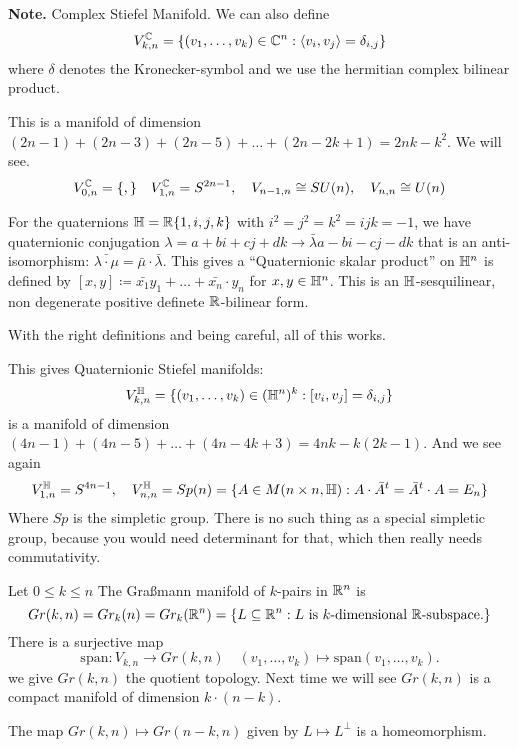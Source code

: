\documentclass[language=english]{TemplateLecture}
\begin{document}
\begin{example}
    \textbf{Note.} Complex Stiefel Manifold. We can also define
    \[V_{k,n}^{\mathbb{C}} = \{(v_1, \dots, v_k) \in \mathbb{C}^n : \langle v_i, v_j\rangle = \delta_{i,j}\}\]
    where \(\delta\) denotes the Kronecker-symbol and we use the hermitian complex bilinear product. 

    This is a manifold of dimension \((2n-1) + (2n-3) + (2n-5) + \dots + (2n-2k +1) = 2nk - k^2\). We will see.
    \[V_{0,n}^\IC = \set *, \quad V_{1,n}^\IC = S^{2n-1}, \quad V_{n-1,n} \cong SU(n), \quad V_{n,n} \cong U(n)\]

    For the quaternions \(\mathbb{H} = \mathbb{R}\{1, i,j,k\}\) with \(i^2 = j^2 = k^2 = ijk = -1\), we have quaternionic conjugation \(\lambda = a + bi + cj + dk \to \bar \lambda a- bi - cj - dk\) that is an anti-isomorphism: \(\bar{\lambda \cdot \mu} = \bar \mu \cdot \bar \lambda\). This gives a \enquote{Quaternionic skalar product} on \(\mathbb{H}^n\) is defined by \([x,y] \coloneq \bar{x_1} y_1 + \dots + \bar{x_n} \cdot y_n\) for \(x,y \in \mathbb{H}^n\). This is an \(\mathbb{H}\)-sesquilinear, non degenerate positive definete \(\mathbb{R}\)-bilinear form.

    With the right definitions and being careful, all of this works.

    This gives Quaternionic Stiefel manifolds:
    \[V_{k,n}^{\mathbb{H}} = \{(v_1, \dots, v_k) \in (\mathbb{H}^n)^k : [v_i, v_j] = \delta_{i,j}\}\]
    is a manifold of dimension \((4n-1) + (4n-5) + \dots + (4n - 4k +3) = 4nk - k(2k-1)\). And we see again
    \[V_{1,n}^{\mathbb{H}} = S^{4n-1}, \quad V_{n,n}^{\mathbb{H}} = Sp(n) = \{A \in M(n\times n, \mathbb{H}) : A\cdot \bar A ^t = \bar A ^t \cdot A = E_n\}\]
    Where \(Sp\) is the simpletic group. There is no such thing as a special simpletic group, because you would need determinant for that, which then really needs commutativity.
\end{example}

\begin{example}
    Let \(0 \leq k \leq n\) The Graßmann manifold of \(k\)-pairs in \(\mathbb{R}^n\) is
    \[Gr(k,n) = Gr_k(n) = Gr_k(\mathbb{R}^n) = \{L \subseteq \mathbb{R}^n : L \text{ is } k\text{-dimensional } \mathbb{R}\text{-subspace.}\}\]
    There is a surjective map
    \[\mathrm{span}\colon V_{k,n} \to Gr(k,n) \quad (v_1, \dots, v_k) \mapsto \mathrm{span}(v_1, \dots, v_k).\]
    we give \(Gr(k,n)\) the quotient topology. Next time we will see \(Gr(k,n)\) is a compact manifold of dimension \(k \cdot (n-k)\).

    The map \(Gr(k,n) \mapsto Gr(n-k,n)\) given by \(L \mapsto L^\perp\) is a homeomorphism.
\end{example}
\end{document}
